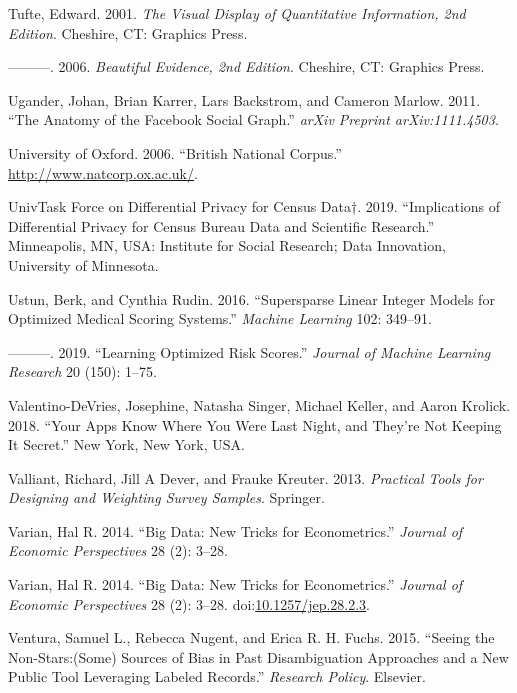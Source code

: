 \documentclass[]{krantz}
\begin{document}
\hypertarget{ref-edward2001visual}{}
Tufte, Edward. 2001. \emph{The Visual Display of Quantitative
Information, 2nd Edition}. Cheshire, CT: Graphics Press.

\hypertarget{ref-edward2006beauty}{}
---------. 2006. \emph{Beautiful Evidence, 2nd Edition}. Cheshire, CT:
Graphics Press.

\hypertarget{ref-ugander2011}{}
Ugander, Johan, Brian Karrer, Lars Backstrom, and Cameron Marlow. 2011.
``The Anatomy of the Facebook Social Graph.'' \emph{arXiv Preprint
arXiv:1111.4503}.

\hypertarget{ref-bnc}{}
University of Oxford. 2006. ``British National Corpus.''
\url{http://www.natcorp.ox.ac.uk/}.

\hypertarget{ref-UnivTaskForceonDifferentialPrivacyforCensusData2019}{}
UnivTask Force on Differential Privacy for Census Data†. 2019.
``Implications of Differential Privacy for Census Bureau Data and
Scientific Research.'' Minneapolis, MN, USA: Institute for Social
Research; Data Innovation, University of Minnesota.

\hypertarget{ref-Ustun2016}{}
Ustun, Berk, and Cynthia Rudin. 2016. ``Supersparse Linear Integer
Models for Optimized Medical Scoring Systems.'' \emph{Machine Learning}
102: 349--91.

\hypertarget{ref-Ustun2019}{}
---------. 2019. ``Learning Optimized Risk Scores.'' \emph{Journal of
Machine Learning Research} 20 (150): 1--75.

\hypertarget{ref-Valentino-DeVries}{}
Valentino-DeVries, Josephine, Natasha Singer, Michael Keller, and Aaron
Krolick. 2018. ``Your Apps Know Where You Were Last Night, and They're
Not Keeping It Secret.'' New York, New York, USA.

\hypertarget{ref-valliant2013practical}{}
Valliant, Richard, Jill A Dever, and Frauke Kreuter. 2013.
\emph{Practical Tools for Designing and Weighting Survey Samples}.
Springer.

\hypertarget{ref-varian2014big}{}
Varian, Hal R. 2014. ``Big Data: New Tricks for Econometrics.''
\emph{Journal of Economic Perspectives} 28 (2): 3--28.

\hypertarget{ref-Varian2014}{}
Varian, Hal R. 2014. ``Big Data: New Tricks for Econometrics.''
\emph{Journal of Economic Perspectives} 28 (2): 3--28.
doi:\href{https://doi.org/10.1257/jep.28.2.3}{10.1257/jep.28.2.3}.

\hypertarget{ref-ventura2015seeing}{}
Ventura, Samuel L., Rebecca Nugent, and Erica R. H. Fuchs. 2015.
``Seeing the Non-Stars:(Some) Sources of Bias in Past Disambiguation
Approaches and a New Public Tool Leveraging Labeled Records.''
\emph{Research Policy}. Elsevier.
\end{document}
